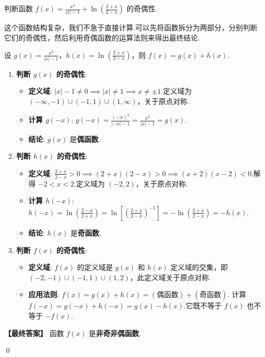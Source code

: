 \begin{exercise}
	判断函数 $f(x) = \frac{x^2}{|x|-1} + \ln\left(\frac{2+x}{2-x}\right)$ 的奇偶性.
\end{exercise}
\begin{solution}
	\textcolor{green!50!black}{这个函数结构复杂，我们不急于直接计算.可以先将函数拆分为两部分，分别判断它们的奇偶性，然后利用奇偶函数的运算法则来得出最终结论.}
	
	设 $g(x) = \frac{x^2}{|x|-1}$，$h(x) = \ln\left(\frac{2+x}{2-x}\right)$，则 $f(x)=g(x)+h(x)$.

	\begin{enumerate}
		\item \textbf{判断 $g(x)$ 的奇偶性}:
		\begin{itemize}
			\item \textbf{定义域}: $|x|-1 \neq 0 \implies |x| \neq 1 \implies x \neq \pm 1$.定义域为 $(-\infty, -1)\cup(-1,1)\cup(1,\infty)$，关于原点对称.
			\item \textbf{计算 $g(-x)$}: $g(-x) = \frac{(-x)^2}{|-x|-1} = \frac{x^2}{|x|-1} = g(x)$.
			\item \textbf{结论}: $g(x)$ 是\textbf{偶函数}.
		\end{itemize}
		
		\item \textbf{判断 $h(x)$ 的奇偶性}:
		\begin{itemize}
			\item \textbf{定义域}: $\frac{2+x}{2-x} > 0 \implies (2+x)(2-x) > 0 \implies (x+2)(x-2) < 0$.解得 $-2 < x < 2$.定义域为 $(-2,2)$，关于原点对称.
			\item \textbf{计算 $h(-x)$}: $h(-x) = \ln\left(\frac{2-x}{2+x}\right) = \ln\left[\left(\frac{2+x}{2-x}\right)^{-1}\right] = -\ln\left(\frac{2+x}{2-x}\right) = -h(x)$.
			\item \textbf{结论}: $h(x)$ 是\textbf{奇函数}.
		\end{itemize}
		
		\item \textbf{判断 $f(x)$ 的奇偶性}:
		\begin{itemize}
			\item \textbf{定义域}: $f(x)$ 的定义域是 $g(x)$ 和 $h(x)$ 定义域的交集，即 $(-2, -1)\cup(-1,1)\cup(1,2)$，此定义域关于原点对称.
			\item \textbf{应用法则}: $f(x) = g(x) + h(x) = (\text{偶函数}) + (\text{奇函数})$.
			计算 $f(-x) = g(-x)+h(-x) = g(x)-h(x)$.它既不等于 $f(x)$ 也不等于 $-f(x)$.
		\end{itemize}
	\end{enumerate}
	\textbf{【最终答案】}
	函数 $f(x)$ 是\textbf{非奇非偶函数}.
\end{solution}
\qed


